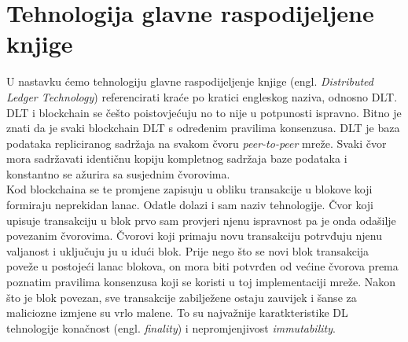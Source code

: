 \documentclass[times, utf8, zavrsni]{fer}
\begin{document}
\chapter{Tehnologija glavne raspodijeljene knjige}
U nastavku ćemo tehnologiju glavne raspodijeljenje knjige (engl. \emph{Distributed Ledger Technology})
 referencirati kraće po kratici engleskog naziva, odnosno DLT. \\ 
DLT i blockchain se češto poistovjećuju no to nije u potpunosti ispravno. Bitno je znati da je 
svaki blockchain DLT s određenim pravilima konsenzusa.
DLT je baza podataka repliciranog sadržaja na svakom čvoru \emph{peer-to-peer} mreže. Svaki čvor
mora sadržavati identičnu kopiju kompletnog sadržaja baze podataka i konstantno se ažurira sa susjednim čvorovima. \\
Kod blockchaina se te promjene zapisuju u obliku transakcije u blokove koji formiraju neprekidan lanac.
Odatle dolazi i sam naziv tehnologije. Čvor koji upisuje transakciju u blok prvo sam provjeri njenu ispravnost pa je onda odašilje povezanim čvorovima.
Čvorovi koji primaju novu transakciju potrvđuju njenu valjanost i uključuju ju u idući blok. Prije nego što se novi blok transakcija poveže u postojeći lanac
blokova, on mora biti potvrđen od većine čvorova prema poznatim pravilima konsenzusa koji se koristi
u toj implementaciji mreže. Nakon što je blok povezan, sve transakcije zabilježene ostaju zauvijek i
šanse za maliciozne izmjene su vrlo malene. To su najvažnije karatkteristike DL tehnologije konačnost (engl. \emph{finality}) i nepromjenjivost \emph{immutability}.
\end{document}
